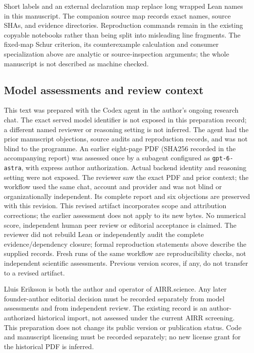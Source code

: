 \documentclass[11pt]{article}
\begin{document}
Short labels and an external declaration map replace long wrapped Lean names
in this manuscript. The companion source map records exact names, source SHAs,
and evidence directories. Reproduction commands remain in the existing
copyable notebooks rather than being split into misleading line fragments.
The fixed-map Schur criterion, its counterexample calculation and consumer
specialization above are analytic or source-inspection arguments; the whole
manuscript is not described as machine checked.

\clearpage
\subsection*{Model assessments and review context}
This text was prepared with the Codex agent in the author's ongoing research
chat. The exact served model identifier is not exposed in this preparation
record; a different named reviewer or reasoning setting is not inferred.
The agent had the prior manuscript objections, source audits and reproduction
records, and was not blind to the programme. An earlier eight-page PDF (SHA256 recorded in the accompanying report) was
assessed once by a subagent configured as \texttt{gpt-6-astra}, with express
author authorization. Actual backend identity and reasoning setting were
not exposed. The reviewer saw the exact PDF and prior context; the workflow
used the same chat, account and provider and was not blind or organizationally
independent. Its complete report and six objections are preserved with this
revision. This revised artifact incorporates scope and attribution corrections;
the earlier assessment does not apply to its new bytes. No numerical score,
independent human peer review or editorial acceptance is claimed. The reviewer
did not rebuild Lean or independently audit the complete evidence/dependency
closure; formal reproduction statements above describe the supplied records. Fresh runs of the same workflow are
reproducibility checks, not independent scientific assessments. Previous
version scores, if any, do not transfer to a revised artifact.

Lluis Eriksson is both the author and operator of AIRR.science. Any later
founder-author editorial decision must be recorded separately from model
assessments and from independent review. The existing record \cite{eriksson}
is an author-authorized historical import, not assessed under the current
AIRR screening. This preparation does not change its public version or
publication status. Code and manuscript licensing must be recorded separately;
no new license grant for the historical PDF is inferred.
\end{document}
